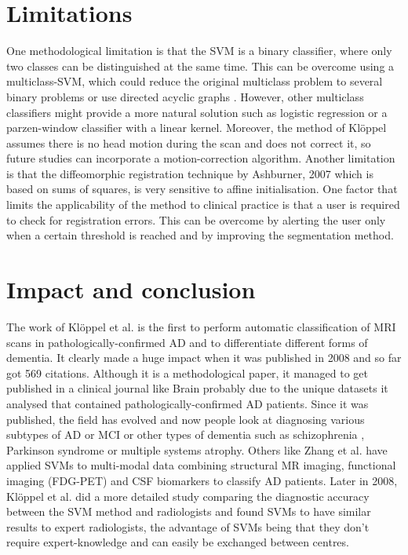 \documentclass[11pt,a4paper,oneside]{report}
\begin{document}
\section*{Limitations}

One methodological limitation is that the SVM is a binary classifier, where only two classes can be distinguished at the same time. This can be overcome using a multiclass-SVM, which could reduce the original multiclass problem to several binary problems \cite{duan2005best} or use directed acyclic graphs \cite{platt1999large}. However, other multiclass classifiers might provide a more natural solution such as logistic regression \cite{desikan2009automated} or a parzen-window classifier with a linear kernel. \cite{shawe2004kernel} Moreover, the method of Kl\"{o}ppel \cite{kloppel2008automatic} assumes there is no head motion during the scan and does not correct it, so future studies can incorporate a motion-correction algorithm. Another limitation is that the diffeomorphic registration technique by Ashburner, 2007 \cite{ashburner2007fast} which is based on sums of squares, is very sensitive to affine initialisation. \cite{avants2011reproducible} One factor that limits the applicability of the method to clinical practice is that a user is required to check for registration errors. This can be overcome by alerting the user only when a certain threshold is reached and by improving the segmentation method.

\section*{Impact and conclusion}

The work of Kl\"{o}ppel et al. \cite{kloppel2008automatic} is the first to perform automatic classification of MRI scans in pathologically-confirmed AD and to differentiate different forms of dementia. It clearly made a huge impact when it was published in 2008 and so far got 569 citations. Although it is a methodological paper, it managed to get published in a clinical journal like Brain probably due to the unique datasets it analysed that contained pathologically-confirmed AD patients. Since it was published, the field has evolved and now people look at diagnosing various subtypes of AD or MCI \cite{haller2013individual} or other types of dementia such as schizophrenia \cite{ardekani2011diffusion}, Parkinson syndrome \cite{focke2011individual} or multiple systems atrophy. \cite{focke2011individual} Others like Zhang et al. \cite{zhang2011multimodal} have applied SVMs to multi-modal data combining structural MR imaging, functional imaging (FDG-PET) and CSF biomarkers to classify AD patients. Later in 2008, Kl\"{o}ppel et al. \cite{kloppel2008accuracy} did a more detailed study comparing the diagnostic accuracy between the SVM method and radiologists and found SVMs to have similar results to expert radiologists, the advantage of SVMs being that they don't require expert-knowledge and can easily be exchanged between centres.
\end{document}
